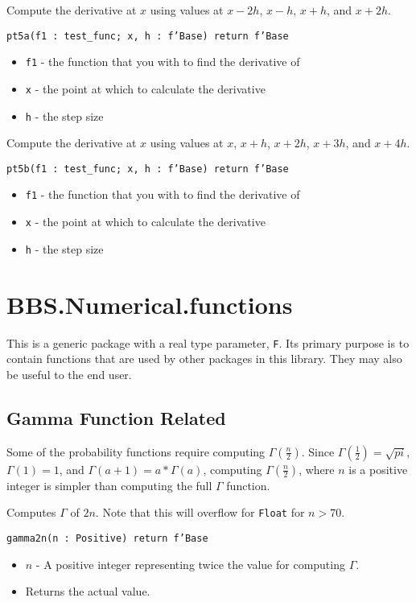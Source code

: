 \documentclass[10pt, openany]{book}
\newcommand{\function}[1]{\texttt{#1}}
\newcommand{\datatype}[1]{\texttt{#1}}
\begin{document}
Compute the derivative at $x$ using values at $x-2h$, $x-h$, $x+h$, and $x+2h$.

\function{pt5a(f1 : test\_func; x, h : f'Base) return f'Base}
\begin{itemize}
  \item \function{f1} - the function that you with to find the derivative of
  \item \function{x} - the point at which to calculate the derivative
  \item \function{h} - the step size
\end{itemize}

Compute the derivative at $x$ using values at $x$, $x+h$, $x+2h$, $x+3h$, and $x+4h$.

\function{pt5b(f1 : test\_func; x, h : f'Base) return f'Base}
\begin{itemize}
  \item \function{f1} - the function that you with to find the derivative of
  \item \function{x} - the point at which to calculate the derivative
  \item \function{h} - the step size
\end{itemize}

\section{BBS.Numerical.functions}
This is a generic package with a real type parameter, \datatype{F}.  Its primary purpose is to contain functions that are used by other packages in this library.  They may also be useful to the end user.

\subsection{Gamma Function Related}
Some of the probability functions require computing $\Gamma(\frac{n}{2})$.  Since $\Gamma(\frac{1}{2})=\sqrt{pi}$, $\Gamma(1) = 1$, and $\Gamma(a+1) = a*\Gamma(a)$, computing $\Gamma(\frac{n}{2})$, where $n$ is a positive integer is simpler than computing the full $\Gamma$ function.

Computes $\Gamma$ of $2n$.  Note that this will overflow for \datatype{Float} for $n>70$.

\function{gamma2n(n : Positive) return f'Base}
\begin{itemize}
  \item $n$ - A positive integer representing twice the value for computing $\Gamma$.
  \item Returns the actual value.
\end{itemize}
\end{document}
